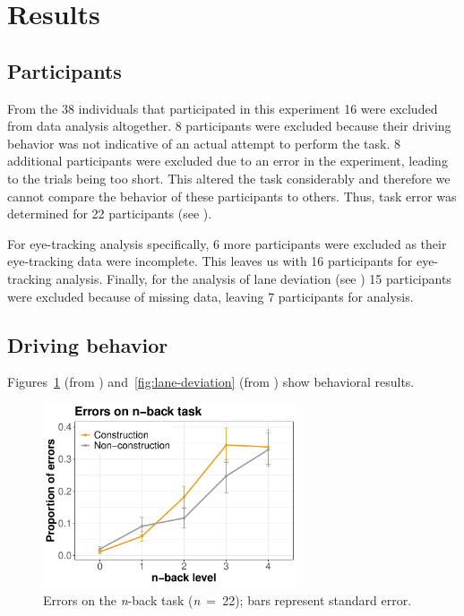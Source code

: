 
\section{Results}\label{sec:results}
\subsection{Participants}
From the 38 individuals that participated in this experiment 16 were excluded from data analysis altogether.
8 participants were excluded because their driving behavior was not indicative of an actual attempt to perform the task.
8 additional participants were excluded due to an error in the experiment, leading to the trials being too short.
This altered the task considerably and therefore we cannot compare the behavior of these participants to others.
Thus, task error was determined for 22 participants (see \citealp{DeMooij2021}). 

For eye-tracking analysis specifically, 6 more participants were excluded as their eye-tracking data were incomplete. 
This leaves us with 16 participants for eye-tracking analysis.
Finally, for the analysis of lane deviation (see \citealp{Kelapanda2021}) 15 participants were excluded because of missing data, leaving 7 participants for analysis.

\subsection{Driving behavior}
Figures~\ref{fig:errors} (from \citealp{DeMooij2021}) and~\ref{fig:lane-deviation} (from \citealp{Kelapanda2021}) show behavioral results.

\begin{figure}
  \centering
  \includegraphics[width=7.5cm]{images/error_rates.pdf}
  \caption{Errors on the \textit{n}-back task (\textit{n}\ =\ 22); bars represent standard error.}
  \label{fig:errors}
\end{figure}

